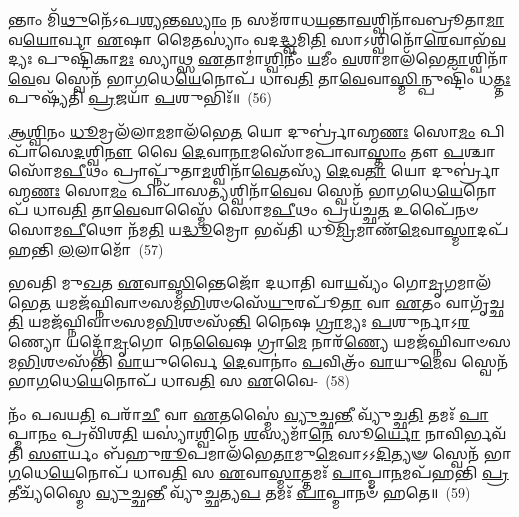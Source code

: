 𑌨𑍍𑌤𑌾𑌂 𑌮𑌿᳴\-\ul{𑌥𑍁}\-𑌨𑍇᳴\-𑌽𑌪\-\ul{𑌶𑍍𑌯}\-𑌨𑍍𑌤\-\ul{𑌸𑍍𑌯𑌾𑌂} 𑌨 𑌸𑌮᳴𑌰𑌾𑌧\-\ul{𑌯}\-𑌨𑍍𑌤𑌾\-\ul{𑌵}\-𑌶𑍍𑌵𑌿𑌨𑌾᳴\-𑌵𑌬𑍍𑌰𑍂𑌤𑌾\-\ul{𑌮𑌾}\-𑌵\-\ul{𑌯𑍋}\-𑌰𑍍𑌵𑌾 \ul{𑌏}\-𑌷𑌾 𑌮𑍈𑌤𑌸𑍍𑌯𑌾𑌂॑ 𑌵𑌦\-\ul{𑌦𑍍𑌧𑍍𑌵}\-𑌮𑌿\-\ul{𑌤𑌿} 𑌸𑌾\-𑌽𑌶𑍍𑌵𑌿𑌨𑍋᳴\-\ul{𑌰𑍇}\-𑌵𑌾𑌭᳴\-\ul{𑌵}\-𑌦𑍍𑌯𑌃 𑌪𑍁𑌷𑍍𑌟𑌿᳴𑌕𑌾\-\ul{𑌮𑌃} 𑌸𑍍𑌯𑌾𑌥𑍍𑌸 \ul{𑌏}\-𑌤𑌾𑌮𑌾॑\-\ul{𑌶𑍍𑌵𑌿}\-𑌨𑍀𑌂 \ul{𑌯}\-𑌮𑍀𑌂 \ul{𑌵}\-𑌶𑌾𑌮𑌾𑌲᳴𑌭𑍇\-\ul{𑌤𑌾}\-𑌶𑍍𑌵𑌿𑌨𑌾᳴\-\ul{𑌵𑍇}\-𑌵 𑌸𑍍𑌵𑍇𑌨᳴ 𑌭𑌾\-\ul{𑌗}\-𑌧𑍇\-\ul{𑌯𑍇}\-𑌨𑍋𑌪᳴ 𑌧𑌾𑌵\-\ul{𑌤𑌿} 𑌤𑌾\-\ul{𑌵𑍇}\-𑌵𑌾\-\ul{𑌸𑍍𑌮𑌿}\-𑌨𑍍𑌪𑍁𑌷𑍍𑌟𑌿𑌂᳴ 𑌧\-\ul{𑌤𑍍𑌤𑌃} 𑌪𑍁𑌷𑍍𑌯᳴𑌤𑌿 \ul{𑌪𑍍𑌰}\-𑌜𑌯𑌾᳴ \ul{𑌪}\-𑌶𑍁𑌭𑌿𑌃᳴॥~(56)

{\anuvakamend[{\-\ul{𑌅}\-\-\ul{𑌨𑍍𑌨𑌾}\-𑌦𑍋॑\-𑌽\-\ul{𑌨𑍍𑌨𑌾}\-𑌦 \ul{𑌏}\-𑌵 𑌭᳴𑌵𑌤𑍍𑌯𑌵𑌿\-\ul{𑌨𑍍𑌦}\-𑌨𑍍𑌪𑌞𑍍𑌚᳴𑌚𑌤𑍍𑌵𑌾𑌰𑌿𑍞𑌶𑌚𑍍𑌚}]}

\-\ul{𑌆}\-\-\ul{𑌶𑍍𑌵𑌿}\-𑌨𑌂 \ul{𑌧𑍂}\-𑌮𑍍𑌰𑌲᳴𑌲𑌾\-\ul{𑌮}\-𑌮𑌾\-𑌲᳴𑌭𑍇\-\ul{𑌤} 𑌯𑍋 𑌦𑍁𑌰𑍍𑌬𑍍𑌰𑌾॑𑌹𑍍𑌮\-\ul{𑌣𑌃} 𑌸𑍋\-\ul{𑌮𑌂} 𑌪𑌿𑌪𑌾᳴𑌸𑍇\-\ul{𑌦}\-𑌶𑍍𑌵𑌿\-\ul{𑌨𑍗} 𑌵𑍈 \ul{𑌦𑍇}\-𑌵𑌾\-\ul{𑌨𑌾}\-𑌮𑌸𑍋᳴𑌮𑌪𑌾𑌵𑌾\-\ul{𑌸𑍍𑌤𑌾𑌂} 𑌤𑍗 \ul{𑌪}\-𑌶𑍍𑌚𑌾 𑌸𑍋᳴𑌮\-\ul{𑌪𑍀}\-𑌥𑌂 𑌪𑍍𑌰𑌾𑌪𑍍𑌨𑍁᳴𑌤𑌾\-\ul{𑌮}\-𑌶𑍍𑌵𑌿𑌨𑌾᳴\-\ul{𑌵𑍇}\-𑌤𑌸𑍍𑌯᳴ \ul{𑌦𑍇}\-𑌵\-\ul{𑌤𑌾} 𑌯𑍋 𑌦𑍁𑌰𑍍𑌬𑍍𑌰𑌾॑𑌹𑍍𑌮\-\ul{𑌣𑌃} 𑌸𑍋\-\ul{𑌮𑌂} 𑌪𑌿𑌪𑌾᳴𑌸\-\ul{𑌤𑍍𑌯}\-𑌶𑍍𑌵𑌿𑌨𑌾᳴\-\ul{𑌵𑍇}\-𑌵 𑌸𑍍𑌵𑍇𑌨᳴ 𑌭𑌾\-\ul{𑌗}\-𑌧𑍇\-\ul{𑌯𑍇}\-𑌨𑍋𑌪᳴ 𑌧𑌾𑌵\-\ul{𑌤𑌿} 𑌤𑌾\-\ul{𑌵𑍇}\-𑌵𑌾𑌸𑍍𑌮𑍈᳴ 𑌸𑍋𑌮\-\ul{𑌪𑍀}\-𑌥𑌂 𑌪𑍍𑌰𑌯᳴𑌚𑍍𑌛\-\ul{𑌤} 𑌉𑌪𑍈᳴𑌨𑍞 𑌸𑍋𑌮\-\ul{𑌪𑍀}\-𑌥𑍋 𑌨᳴𑌮\-\ul{𑌤𑌿} 𑌯\-\ul{𑌦𑍍𑌧𑍂}\-𑌮𑍍𑌰𑍋 𑌭𑌵᳴𑌤𑌿 𑌧𑍂\-\ul{𑌮𑍍𑌰𑌿}\-𑌮𑌾𑌣᳴\-\ul{𑌮𑍇}\-𑌵𑌾\-\ul{𑌸𑍍𑌮𑌾}\-𑌦𑌪᳴𑌹𑌨𑍍𑌤𑌿 \ul{𑌲}\-𑌲𑌾𑌮𑍋᳴~(57)

𑌭𑌵𑌤𑌿 𑌮𑍁\-\ul{𑌖}\-𑌤 \ul{𑌏}\-𑌵𑌾\-\ul{𑌸𑍍𑌮𑌿}\-𑌨𑍍𑌤𑍇𑌜𑍋᳴ 𑌦𑌧𑌾𑌤𑌿 𑌵𑌾\-\ul{𑌯}\-𑌵𑍍𑌯𑌂᳴ 𑌗𑍋\-\ul{𑌮𑍃}\-𑌗𑌮𑌾\-𑌲᳴𑌭𑍇\-\ul{𑌤} 𑌯𑌮𑌜᳴𑌘𑍍𑌨𑌿𑌵𑌾𑍞𑌸𑌮\-\ul{𑌭𑌿}\-𑌶𑍞𑌸𑍇᳴\-\ul{𑌯𑍁}\-𑌰𑌪𑍂᳴\-\ul{𑌤𑌾} 𑌵𑌾 \ul{𑌏}\-𑌤𑌂 𑌵𑌾𑌗𑍃᳴𑌚𑍍𑌛\-\ul{𑌤𑌿} 𑌯𑌮𑌜᳴𑌘𑍍𑌨𑌿𑌵𑌾𑍞𑌸𑌮\-\ul{𑌭𑌿}\-𑌶𑍞𑌸᳴\-\ul{𑌨𑍍𑌤𑌿} 𑌨𑍈𑌷 \ul{𑌗𑍍𑌰𑌾}\-𑌮𑍍𑌯𑌃 \ul{𑌪}\-𑌶𑍁𑌰𑍍𑌨𑌾𑌽\-\ul{𑌰}\-𑌣𑍍𑌯𑍋 𑌯𑌦𑍍𑌗𑍋᳴\-\ul{𑌮𑍃}\-𑌗𑍋 𑌨𑍇\-\ul{𑌵𑍈}\-𑌷 𑌗𑍍𑌰𑌾\-\ul{𑌮𑍇} 𑌨𑌾𑌰᳴\-\ul{𑌣𑍍𑌯𑍇} 𑌯𑌮𑌜᳴𑌘𑍍𑌨𑌿𑌵𑌾𑍞𑌸𑌮\-\ul{𑌭𑌿}\-𑌶𑍞𑌸᳴𑌨𑍍𑌤𑌿 \ul{𑌵𑌾}\-𑌯𑍁𑌰𑍍𑌵𑍈 \ul{𑌦𑍇}\-𑌵𑌾𑌨𑌾𑌂॑ \ul{𑌪}\-𑌵𑌿𑌤𑍍𑌰𑌂᳴ \ul{𑌵𑌾}\-𑌯𑍁\-\ul{𑌮𑍇}\-𑌵 𑌸𑍍𑌵𑍇𑌨᳴ 𑌭𑌾\-\ul{𑌗}\-𑌧𑍇\-\ul{𑌯𑍇}\-𑌨𑍋𑌪᳴ 𑌧𑌾𑌵\-\ul{𑌤𑌿} 𑌸 \ul{𑌏}\-𑌵𑍈-~(58)

𑌨𑌂᳴ 𑌪𑌵𑌯\-\ul{𑌤𑌿} 𑌪𑌰𑌾᳴\-\ul{𑌚𑍀} 𑌵𑌾 \ul{𑌏}\-𑌤𑌸𑍍𑌮𑍈॑ \ul{𑌵𑍍𑌯𑍁}\-𑌚𑍍𑌛\-\ul{𑌨𑍍𑌤𑍀} 𑌵𑍍𑌯𑍁᳴𑌚𑍍𑌛\-\ul{𑌤𑌿} 𑌤𑌮𑌃᳴ \ul{𑌪𑌾}\-𑌪𑍍𑌮𑌾\-\ul{𑌨𑌂} 𑌪𑍍𑌰𑌵𑌿᳴𑌶\-\ul{𑌤𑌿} 𑌯𑌸𑍍𑌯𑌾॑\-\ul{𑌶𑍍𑌵𑌿}\-𑌨𑍇 \ul{𑌶}\-𑌸𑍍𑌯𑌮𑌾᳴\-\ul{𑌨𑍇} 𑌸𑍂\-\ul{𑌰𑍍𑌯𑍋} 𑌨𑌾𑌵𑌿𑌰𑍍𑌭𑌵᳴𑌤𑌿 \ul{𑌸𑍗}\-𑌰𑍍𑌯𑌂 𑌬᳴𑌹𑍁\-\ul{𑌰𑍂}\-𑌪𑌮𑌾𑌲᳴𑌭𑍇\-\ul{𑌤𑌾}\-𑌮𑍁\-\ul{𑌮𑍇}\-𑌵𑌾𑌽𑌽\-\ul{𑌦𑌿}\-𑌤𑍍𑌯𑍟 𑌸𑍍𑌵𑍇𑌨᳴ 𑌭𑌾\-\ul{𑌗}\-𑌧𑍇\-\ul{𑌯𑍇}\-𑌨𑍋𑌪᳴ 𑌧𑌾𑌵\-\ul{𑌤𑌿} 𑌸 \ul{𑌏}\-𑌵𑌾\-\ul{𑌸𑍍𑌮𑌾}\-𑌤𑍍𑌤𑌮𑌃᳴ \ul{𑌪𑌾}\-𑌪𑍍𑌮𑌾\-\ul{𑌨}\-𑌮𑌪᳴𑌹𑌨𑍍𑌤𑌿 \ul{𑌪𑍍𑌰}\-𑌤𑍀𑌚𑍍𑌯᳴𑌸𑍍𑌮𑍈 \ul{𑌵𑍍𑌯𑍁}\-𑌚𑍍𑌛\-\ul{𑌨𑍍𑌤𑍀} 𑌵𑍍𑌯𑍁᳴\-\ul{𑌚𑍍𑌛}\-𑌤𑍍𑌯\-\ul{𑌪} 𑌤𑌮𑌃᳴ \ul{𑌪𑌾}\-𑌪𑍍𑌮𑌾𑌨𑍞᳴ 𑌹𑌤𑍇॥~(59)

{\anuvakamend[{\-\ul{𑌲}\-𑌲𑌾\-\ul{𑌮𑌃} 𑌸 \ul{𑌏}\-𑌵 𑌷𑌟𑍍𑌚᳴𑌤𑍍𑌵𑌾𑌰𑌿𑍞𑌶𑌚𑍍𑌚}]}%

